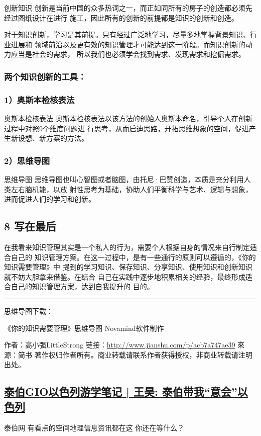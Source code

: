 \documentclass[11pt]{ctexart}
\begin{document}
{{{{创新知识
创新是当前中国的众多热词之一，而正如同所有的房子的创造都必须先经过图纸设计在进行
施工，因此所有的创新的前提都是知识的创新和创造。

对于知识创新，学习是其前提。只有经过广泛地学习，尽量多地掌握背景知识、行业进展和
领域前沿以及更有效的知识管理才可能达到这一阶段。而知识创新的动力应当是社会的需求，
所以我们也必须学会找到需求、发现需求和挖倔需求。

\subsubsection{两个知识创新的工具：}
\label{sec:org37dee46}

\subsubsection{1）奥斯本检核表法}
\label{sec:orgc0a08b2}


奥斯本检核表法
奥斯本检核表法以该方法的创始人奥斯本命名，引导个人在创新过程中对照9个维度问题进
行思考，从而启迪思路，开拓思维想象的空间，促进产生新设想、新方案的方法。

\subsubsection{2）思维导图}
\label{sec:org6171f8e}


思维导图
思维导图也叫心智图或者脑图，由托尼·巴赞创造，本质是充分利用人类左右脑机能，以放
射性思考为基础，协助人们平衡科学与艺术、逻辑与想象，进而促进人们的学习和创新。
\subsection{8 写在最后}
\label{sec:org7cf9c41}
在我看来知识管理其实是一个私人的行为，需要个人根据自身的情况来自行制定适合自己的
知识管理方案。在这一过程中，是有一些通行的原则可以遵循的，《你的知识需要管理》中
提到的学习知识、保存知识、分享知识、使用知识和创新知识就不妨大胆拿来借鉴。在结合
自己在实践中逐步地积累相关的经验，最终形成适合自己的知识管理方案，达到自我提升的
目的。

\noindent\rule{\textwidth}{0.5pt}

思维导图下载：

《你的知识需要管理》思维导图 Novamind软件制作

作者：高小强LittleStrong
链接：\url{http://www.jianshu.com/p/acb7a747ae39}
來源：简书
著作权归作者所有。商业转载请联系作者获得授权，非商业转载请注明出处。
\subsection{\href{http://www.sohu.com/a/139847822\_335896?loc=4\&tag\_id=65788}{泰伯GIO以色列游学笔记 | 王昊: 泰伯带我“意会”以色列}}
\label{sec:org876f7d9}
泰伯网
有看点的空间地理信息资讯都在这
你还在等什么？

}}}}
\end{document}
